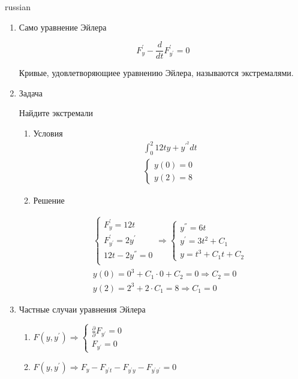 \documentclass{article}
\begin{document}
\begin{otherlanguage*}{russian}
\begin{enumerate}
\item Само уравнение Эйлера

\begin{equation}
F^{'}_y - \frac{d }{d t} F^{'}_{y^{'}} = 0
\end{equation}

Кривые, удовлетворяющиее уравнению Эйлера, называются экстремалями. 

\item Задача 

Найдите экстремали
\begin{enumerate}
\item Условия
\begin{align}
\int_0^2 12 ty + y^{'^{2}} dt \\
\begin{cases}
y(0) = 0 \\ 
y(2) = 8 
\end{cases}
\end{align}
\item Решение

\begin{align} 
\begin{cases}
F^{'}_y = 12 t \\
F^{'}_{y^{'}} = 2 y^{'} \\ 
12 t - 2 y^{''} = 0 \\ 
\end{cases}
\Rightarrow
\begin{cases}
y^{''} = 6t \\
y^{'} = 3t^2 + C_1 \\
y = t^3 + C_1 t + C_2 
\end{cases} \\
y(0) = 0^3 + C_1 \cdot 0 + C_2 = 0 \Rightarrow  C_2 = 0 \\ 
y(2) = 2^3 + 2 \cdot C_1 = 8 \Rightarrow C_1 =0 
\end{align} 
\end{enumerate}
\item Частные случаи уравнения Эйлера 

\begin{enumerate}
\item $ 
F(y, y^{'}) \Rightarrow \begin{cases}\frac{\partial}{\partial} F_{y^{'}} = 0 \\
F_{y^{'}} = 0 \end{cases} $

\item $ F (y, y^{'}) \Rightarrow F_y - F_{y^{'} t} - F_{y^{'} y} - F_{y^{'} y^{'}} = 0 $


\end{enumerate}
\end{enumerate}
\end{otherlanguage*}
\end{document}
